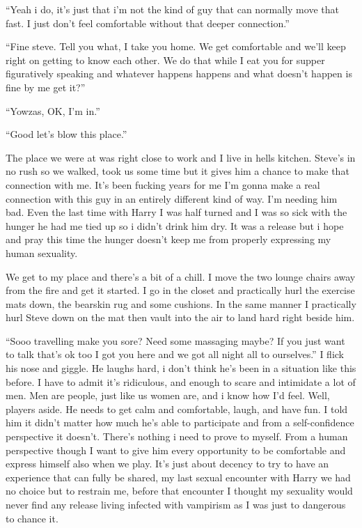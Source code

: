 ``Yeah i do, it's just that i'm not the kind of guy that can normally move that fast. I just don't feel comfortable without that deeper connection.''

``Fine steve. Tell you what, I take you home. We get comfortable and we'll keep right on getting to know each other. We do that while I eat you for supper figuratively speaking and whatever happens happens and what doesn't happen is fine by me get it?''

``Yowzas, OK, I'm in.''

``Good let's blow this place.''

The place we were at was right close to work and I live in hells kitchen. Steve's in no rush so we walked, took us some time but it gives him a chance to make that connection with me. It's been fucking years for me I'm gonna make a real connection with this guy in an entirely different kind of way. I'm needing him bad. Even the last time with Harry I was half turned and I was so sick with the hunger he had me tied up so i didn't drink him dry. It was a release but i hope and pray this time the hunger doesn't keep me from properly expressing my human sexuality.

We get to my place and there's a bit of a chill. I move the two lounge chairs away from the fire and get it started. I go in the closet and practically hurl the exercise mats down, the bearskin rug and some cushions. In the same manner I practically hurl Steve down on the mat then vault into the air to land hard right beside him.

``Sooo travelling make you sore? Need some massaging maybe? If you just want to talk that's ok too I got you here and we got all night all to ourselves.'' I flick his nose and giggle. He laughs hard, i don't think he's been in a situation like this before. I have to admit it's ridiculous, and enough to scare and intimidate a lot of men. Men are people, just like us women are, and i know how I'd feel. Well, players aside. He needs to get calm and comfortable, laugh, and have fun. I told him it didn't matter how much he's able to participate and from a self-confidence perspective it doesn't. There's nothing i need to prove to myself. From a human perspective though I want to give him every opportunity to be comfortable and express himself also when we play. It's just about decency to try to have an experience that can fully be shared, my last sexual encounter with Harry we had no choice but to restrain me, before that encounter I thought my sexuality would never find any release living infected with vampirism as I was just to dangerous to chance it.

